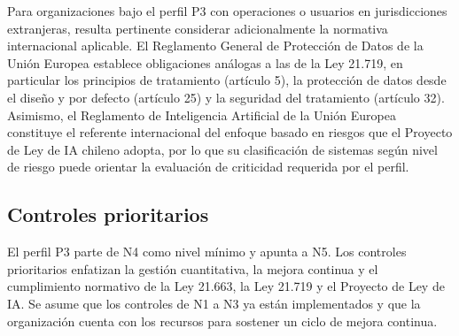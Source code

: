 Para organizaciones bajo el perfil P3 con operaciones o usuarios en jurisdicciones extranjeras, resulta pertinente considerar adicionalmente la normativa internacional aplicable. El Reglamento General de Protección de Datos de la Unión Europea \cite{gdpr} establece obligaciones análogas a las de la Ley 21.719, en particular los principios de tratamiento (artículo 5), la protección de datos desde el diseño y por defecto (artículo 25) y la seguridad del tratamiento (artículo 32). Asimismo, el Reglamento de Inteligencia Artificial de la Unión Europea \cite{aiact} constituye el referente internacional del enfoque basado en riesgos que el Proyecto de Ley de IA chileno adopta, por lo que su clasificación de sistemas según nivel de riesgo puede orientar la evaluación de criticidad requerida por el perfil.

\subsection{Controles prioritarios}

El perfil P3 parte de N4 como nivel mínimo y apunta a N5. Los controles prioritarios
enfatizan la gestión cuantitativa, la mejora continua y el cumplimiento normativo de la
Ley 21.663, la Ley 21.719 y el Proyecto de Ley de IA. Se asume que los controles de
N1 a N3 ya están implementados y que la organización cuenta con los recursos para
sostener un ciclo de mejora continua.

